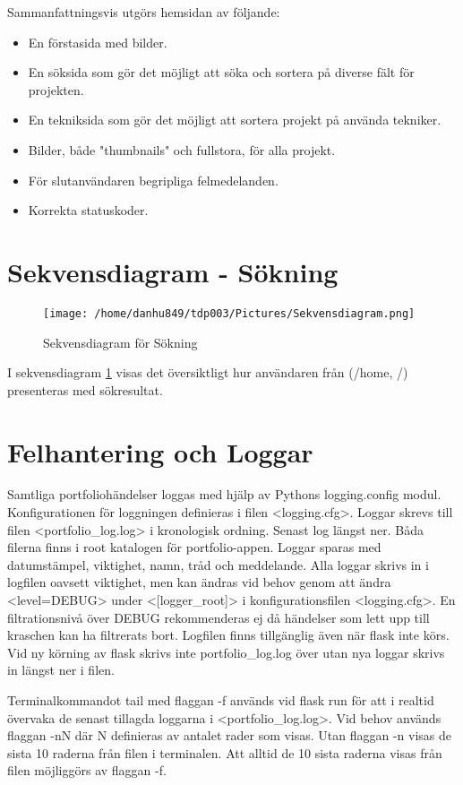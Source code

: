 \documentclass{TDP003mall}
\begin{document}
Sammanfattningsvis utgörs hemsidan av följande:
\begin{itemize}
    \item En förstasida med bilder.
    \item En söksida som gör det möjligt att söka och sortera på diverse fält för projekten.
    \item En tekniksida som gör det möjligt att sortera projekt på använda tekniker.
    \item Bilder, både "thumbnails" och fullstora, för alla projekt.
    \item För slutanvändaren begripliga felmedelanden.
    \item Korrekta statuskoder.
\end{itemize}

\newpage
\section{Sekvensdiagram - Sökning}

\begin{figure}[h]
  \centerline{\texttt{[image: /home/danhu849/tdp003/Pictures/Sekvensdiagram.png]}}
  \caption{Sekvensdiagram för Sökning \label{fig:2}}
\end{figure}

I sekvensdiagram \ref{fig:2} visas det översiktligt hur användaren från (/home, /) presenteras med sökresultat.

\section{Felhantering och Loggar}
Samtliga portfoliohändelser loggas med hjälp av Pythons logging.config modul. Konfigurationen för loggningen definieras i filen <logging.cfg>. Loggar skrevs till filen <portfolio\_log.log> i kronologisk ordning. Senast log längst ner. Båda filerna finns i root katalogen för portfolio-appen. Loggar sparas med datumstämpel, viktighet, namn, tråd och meddelande. Alla loggar skrivs in i logfilen oavsett viktighet, men kan ändras vid behov genom att ändra <level=DEBUG> under <[logger\_root]> i konfigurationsfilen <logging.cfg>. En filtrationsnivå över DEBUG rekommenderas ej då händelser som lett upp till kraschen kan ha filtrerats bort. Logfilen finns tillgänglig även när flask inte körs. Vid ny körning av flask skrivs inte portfolio\_log.log över utan nya loggar skrivs in längst ner i filen.

Terminalkommandot tail med flaggan -f används vid flask run för att i realtid övervaka de senast tillagda loggarna i <portfolio\_log.log>. Vid behov används flaggan -nN där N definieras av antalet rader som visas. Utan flaggan -n visas de sista 10 raderna från filen i terminalen. Att alltid de 10 sista raderna visas från filen möjliggörs av flaggan -f.
\end{document}
